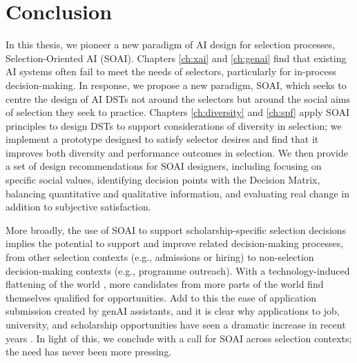 \section{Conclusion}
In this thesis, we pioneer a new paradigm of AI design for selection processes, Selection-Oriented AI (SOAI). Chapters \ref{ch:xai} and \ref{ch:genai} find that existing AI systems often fail to meet the needs of selectors, particularly for in-process decision-making. In response, we propose a new paradigm, SOAI, which seeks to centre the design of AI DSTs not around the selectors but around the social aims of selection they seek to practice. Chapters \ref{ch:diversity} and \ref{ch:spf} apply SOAI principles to design DSTs to support considerations of diversity in selection; we implement a prototype designed to satisfy selector desires and find that it improves both diversity and performance outcomes in selection. We then provide a set of design recommendations for SOAI designers, including focusing on specific social values, identifying decision points with the Decision Matrix, balancing quantitative and qualitative information, and evaluating real change in addition to subjective satisfaction.

More broadly, the use of SOAI to support scholarship-specific selection decisions implies the potential to support and improve related decision-making processes, from other selection contexts (e.g., admissions or hiring) to non-selection decision-making contexts (e.g., programme outreach). With a technology-induced flattening of the world \cite{Friedman_2005}, more candidates from more parts of the world find themselves qualified for opportunities. Add to this the ease of application submission created by genAI assistants, and it is clear why applications to job, university, and scholarship opportunities have seen a dramatic increase in recent years \cite{Kaashoek2024Impact}. In light of this, we conclude with a call for SOAI across selection contexts; the need has never been more pressing.